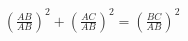 \documentclass[preview]{standalone}
\begin{document}
\begin{align*}
\left(\frac{AB}{AB}\right)^2 + \left(\frac{AC}{AB}\right)^2 = \left(\frac{BC}{AB}\right)^2
\end{align*}
\end{document}
